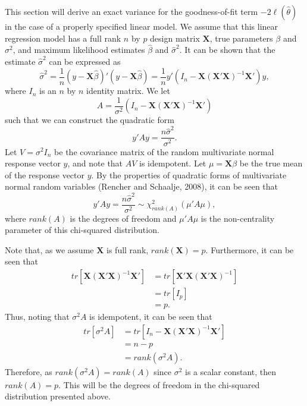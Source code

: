 This section will derive an exact variance for the goodness-of-fit term $-2 \ell (\hat{\theta} )$ in the case of a properly specified
linear model. We assume that this linear regression model has a full rank $n$ by $p$ design matrix $\mathbf{X}$, true parameters $\beta$ and $\sigma^2$,
and maximum likelihood estimates $\hat{\beta}$ and $\hat{\sigma}^2$. It can be shown that the estimate $\hat{\sigma}^2$ can be expressed as
\begin{equation}
	\hat{\sigma}^2 =  \frac{1}{n} (y-\mathbf{X}\hat{\beta})'(y-\mathbf{X}\hat{\beta}) = \frac{1}{n} y'(I_n - \mathbf{X}(\mathbf{X}'\mathbf{X})^{-1}\mathbf{X}')y ,
\end{equation}
where $I_n$ is an $n$ by $n$ identity matrix. We let
\begin{equation}
	A = \frac{1}{\sigma^2} (I_n - \mathbf{X}(\mathbf{X}'\mathbf{X})^{-1}\mathbf{X}') 
\end{equation}
such that we can construct the quadratic form
\begin{equation}
	y'Ay = \frac{n \hat{\sigma}^2}{\sigma^2} .
\end{equation}
Let $V = \sigma^2 I_n$ be the covariance matrix of the random multivariate normal response vector $y$, and note that $AV$ is idempotent. Let $\mu = \mathbf{X} \beta$ be the
true mean of the response vector $y$. By the properties of quadratic forms of multivariate normal random variables (Rencher and Schaalje, 2008), it can be seen that
\begin{equation}
	y'Ay = \frac{n \hat{\sigma}^2}{\sigma^2} \sim \chi^2_{rank \left( A \right) } (\mu 'A\mu) ,
\end{equation}
where $rank \left( A \right)$ is the degrees of freedom and $\mu 'A \mu$ is the non-centrality parameter of this chi-squared distribution.

Note that, as we assume $\mathbf{X}$ is full rank, $rank(\mathbf{X}) = p$. Furthermore, it can be seen that
\begin{equation}
	\begin{split}
	tr\left[ \mathbf{X}(\mathbf{X}'\mathbf{X})^{-1}\mathbf{X}' \right] & = tr \left[ \mathbf{X}'\mathbf{X}(\mathbf{X}'\mathbf{X})^{-1} \right]  \\ 
	& = tr \left[ I_p \right] \\
	& = p .
	\end{split}
\end{equation}
Thus, noting that $\sigma^2 A$ is idempotent, it can be seen that
\begin{equation}
	\begin{split}
	tr \left[ \sigma^2 A \right] & = tr \left[ I_n - \mathbf{X}(\mathbf{X}'\mathbf{X})^{-1}\mathbf{X}' \right]  \\ 
	& = n-p \\
	& = rank \left( \sigma^2 A \right) .
	\end{split}
\end{equation}
Therefore, as $rank \left( \sigma^2 A \right) = rank \left( A \right)$ since $\sigma^2$ is a scalar constant, then $rank \left( A \right) = p$. This will be the degrees of
freedom in the chi-squared distribution presented above.

